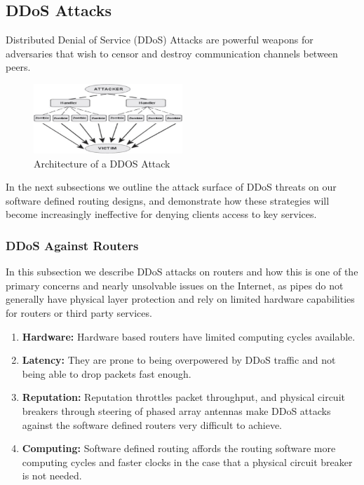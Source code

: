\documentclass[11pt]{article}
\begin{document}
\subsection{DDoS Attacks}

Distributed Denial of Service (DDoS) Attacks are powerful weapons for adversaries that wish to censor and destroy communication channels between peers. 

\begin{figure}[h]
    \centering
    \includegraphics[width=0.5\textwidth]{./images/rsz_ddos_arch.png}
    \vspace{-10pt}
    \caption{Architecture of a DDOS Attack \cite{DDoS-arch}}
\end{figure}

\pagebreak
\noindent In the next subsections we outline the attack surface of DDoS threats on our software defined routing designs, and demonstrate how these strategies will become increasingly ineffective for denying clients access to key services.


\subsubsection{DDoS Against Routers}

In this subsection we describe DDoS attacks on routers and how this is one of the primary concerns and nearly unsolvable issues on the Internet, as pipes do not generally have physical layer protection and rely on limited hardware capabilities for routers or third party services.

\begin{enumerate}
    \item \textbf{Hardware:} Hardware based routers have limited computing cycles available.
    \item \textbf{Latency:} They are prone to being overpowered by DDoS traffic and not being able to drop packets fast enough.
    \item \textbf{Reputation:} Reputation throttles packet throughput, and physical circuit breakers through steering of phased array antennas make DDoS attacks against the software defined routers very difficult to achieve.
    \item \textbf{Computing:} Software defined routing affords the routing software more computing cycles and faster clocks in the case that a physical circuit breaker is not needed.
\end{enumerate}
\end{document}
